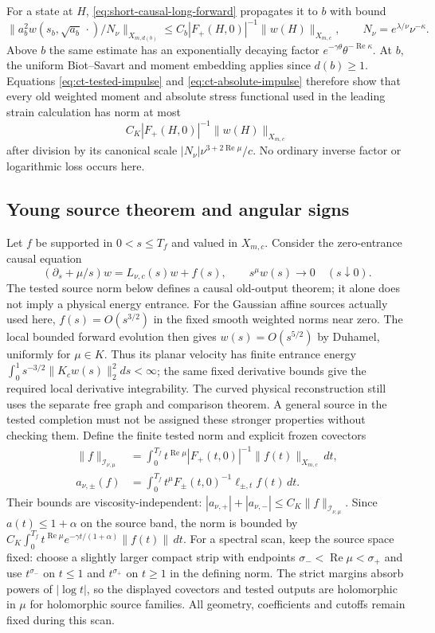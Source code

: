 For a state at $H$, \eqref{eq:short-causal-long-forward}
propagates it to $b$ with bound
\[
 \|a_b^2w(s_b,\sqrt{a_b}\,\cdot)/N_\nu\|_{X_{m,d(b)}}
   \le C_b |F_+(H,0)|^{-1}\|w(H)\|_{X_{m,c}},
 \qquad N_\nu=e^{\lambda/\nu}\nu^{-\kappa}.
\]
Above $b$ the same estimate has an exponentially decaying factor
$e^{-\gamma\theta}\theta^{-\operatorname{Re}\kappa}$.
At $b$, the uniform Biot--Savart and moment embedding applies since
$d(b)\ge1$. Equations \eqref{eq:ct-tested-impulse} and
\eqref{eq:ct-absolute-impulse} therefore show that every old
weighted moment and absolute stress functional used in the leading
strain calculation has norm at most
\begin{equation}\label{eq:young-later-output}
 C_K |F_+(H,0)|^{-1}\|w(H)\|_{X_{m,c}}
\end{equation}
after division by its canonical scale
$|N_\nu|\nu^{3+2\operatorname{Re}\mu}/c$.
No ordinary inverse factor or logarithmic loss occurs here.

\subsection{Young source theorem and angular signs}

Let $f$ be supported in $0<s\le T_f$ and valued in $X_{m,c}$.
Consider the zero-entrance causal equation
\[
 (\partial_s+\mu/s)w=L_{\nu,c}(s)w+f(s),
 \qquad s^\mu w(s)\longrightarrow0\quad(s\downarrow0).
\]
The tested source norm below defines a causal old-output theorem;
it alone does not imply a physical energy entrance. For the Gaussian
affine sources actually used here, $f(s)=O(s^{3/2})$ in the fixed
smooth weighted norms near zero. The local bounded forward evolution
then gives $w(s)=O(s^{5/2})$ by Duhamel, uniformly for $\mu\in K$.
Thus its planar velocity has finite entrance energy
$\int_0^1s^{-3/2}\|K_cw(s)\|_2^2ds<\infty$; the same fixed
derivative bounds give the required local derivative integrability.
The curved physical reconstruction still uses the separate free graph
and comparison theorem. A general source in the tested completion
must not be assigned these stronger properties without checking them.
Define the finite tested norm and explicit frozen covectors
\begin{align*}
 \|f\|_{\mathcal I_{\nu,\mu}}
  &=\int_0^{T_f}t^{\operatorname{Re}\mu}|F_+(t,0)|^{-1}
                         \|f(t)\|_{X_{m,c}}\,dt,\\
 a_{\nu,\pm}(f)
  &=\int_0^{T_f}t^\mu F_\pm(t,0)^{-1}\ell_{\pm,t}f(t)\,dt.
\end{align*}
Their bounds are viscosity-independent:
$|a_{\nu,+}|+|a_{\nu,-}|\le C_K\|f\|_{\mathcal I_{\nu,\mu}}$.
Since $a(t)\le1+\alpha$ on the source band, the norm is bounded by
$C_K\int_0^{T_f}t^{\operatorname{Re}\mu}e^{-\gamma t/(1+\alpha)}
\|f(t)\|\,dt$.
For a spectral scan, keep the source space fixed: choose a slightly
larger compact strip with endpoints $\sigma_-<\operatorname{Re}\mu
<\sigma_+$ and use $t^{\sigma_-}$ on $t\le1$ and
$t^{\sigma_+}$ on $t\ge1$ in the defining norm. The strict margins
absorb powers of $|\log t|$, so the displayed covectors and tested
outputs are holomorphic in $\mu$ for holomorphic source families.
All geometry, coefficients and cutoffs remain fixed during this scan.

